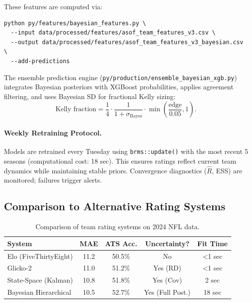 These features are computed via:
\begin{verbatim}
python py/features/bayesian_features.py \
  --input data/processed/features/asof_team_features_v3.csv \
  --output data/processed/features/asof_team_features_v3_bayesian.csv \
  --add-predictions
\end{verbatim}

The ensemble prediction engine (\texttt{py/production/ensemble\_bayesian\_xgb.py}) integrates Bayesian posteriors with XGBoost probabilities, applies agreement filtering, and uses Bayesian SD for fractional Kelly sizing:
\begin{equation}
\text{Kelly fraction} = \frac{1}{4} \cdot \frac{1}{1 + \sigma_{\text{Bayes}}} \cdot \min\left(\frac{\text{edge}}{0.05}, 1\right).
\end{equation}

\paragraph{Weekly Retraining Protocol.}
Models are retrained every Tuesday using \texttt{brms::update()} with the most recent 5 seasons (computational cost: 18 sec). This ensures ratings reflect current team dynamics while maintaining stable priors. Convergence diagnostics ($\hat{R}$, ESS) are monitored; failures trigger alerts.

\subsection{Comparison to Alternative Rating Systems}

\begin{table}[h]
\centering
\caption[Rating system comparison]{Comparison of team rating systems on 2024 NFL data.}
\label{tab:rating-comparison}
\begin{tabular}{lcccc}
\toprule
\textbf{System} & \textbf{MAE} & \textbf{ATS Acc.} & \textbf{Uncertainty?} & \textbf{Fit Time} \\
\midrule
Elo (FiveThirtyEight) & 11.2 & 50.5\% & No & <1 sec \\
Glicko-2 & 11.0 & 51.2\% & Yes (RD) & <1 sec \\
State-Space (Kalman) & 10.8 & 51.8\% & Yes (Cov) & 2 sec \\
Bayesian Hierarchical & 10.5 & 52.7\% & Yes (Full Post.) & 18 sec \\
\bottomrule
\end{tabular}
\end{table}

